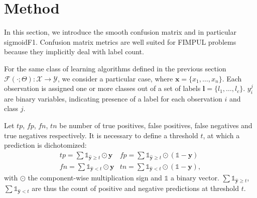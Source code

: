 
\section{Method}
\label{sec:orga8a42f5}
\label{section:method}

In this section, we introduce the smooth confusion matrix and in particular sigmoidF1. Confusion matrix metrics are well suited for FIMPUL problems because they implicitly deal with label count. 


For the same class of learning algorithms defined in the previous section \(\mathcal{F}(\cdot ; \Theta): \mathcal{X} \rightarrow \mathcal{Y}\), we consider a particular case, where \(\mathbf{x} = \{x_1, \ldots, x_n\}\). Each observation is assigned one or more classes out of a set of labels \(\mathbf{l} = \{l_1, \ldots, l_c\}\). \(y_{i}^{j}\) are binary variables, indicating presence of a label for each observation \(i\) and class \(j\).




Let \(tp\), \(fp\), \(fn\), \(tn\) be number of true positives, false positives, false negatives and true negatives respectively. It is necessary to define a threshold \(t\), at which a prediction is dichotomized:
%
\begin{equation}
\label{eq:conf}
\begin{array}{ll} tp = \sum \mathds{1}_{\hat{\mathbf{y}} \geq t} \odot \mathbf{y}  & fp = \sum \mathds{1}_{\hat{\mathbf{y}} \geq t} \odot (\mathds{1} - \mathbf{y}) \\ fn = \sum \mathds{1}_{\hat{\mathbf{y}} < t} \odot \mathbf{y} & tn = \sum \mathds{1}_{\hat{\mathbf{y}} < t} \odot (\mathds{1} - \mathbf{y}),
\end{array}
\end{equation}
%
with \(\odot\) the component-wise multiplication sign and \(\mathds{1}\) a binary vector. \(\sum \mathds{1}_{\hat{\mathbf{y}} \geq t}\), \(\sum \mathds{1}_{\hat{\mathbf{y}} < t}\) are thus the count of positive and negative predictions at threshold \(t\).

